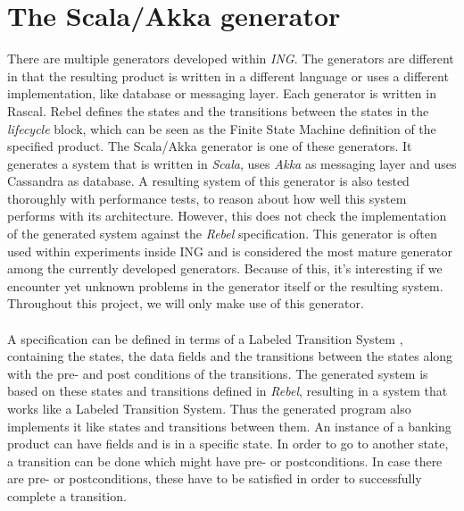 \section{The Scala/Akka generator}
There are multiple generators developed within \textit{ING}. The generators are different in that the resulting product is written in a different language or uses a different implementation, like database or messaging layer. Each generator is written in Rascal. Rebel defines the states and the transitions between the states in the \textit{lifecycle} block, which can be seen as the Finite State Machine definition of the specified product. The Scala/Akka generator is one of these generators. It generates a system that is written in \textit{Scala}, uses \textit{Akka} \cite{siteAkka2017} as messaging layer  and uses Cassandra \cite{siteCassandra2016} as database. A resulting system of this generator is also tested thoroughly with performance tests, to reason about how well this system performs with its architecture. However, this does not check the implementation of the generated system against the \textit{Rebel} specification. This generator is often used within experiments inside ING and is considered the most mature generator among the currently developed generators. Because of this, it's interesting if we encounter yet unknown problems in the generator itself or the resulting system. Throughout this project, we will only make use of this generator.\\
\\
A specification can be defined in terms of a Labeled Transition System \cite{stoel2016solving} , containing the states, the data fields and the transitions between the states along with the pre- and post conditions of the transitions. The generated system is based on these states and transitions defined in \textit{Rebel}, resulting in a system that works like a Labeled Transition System. Thus the generated program also implements it like states and transitions between them. An instance of a banking product can have fields and is in a specific state. In order to go to another state, a transition can be done which might have pre- or postconditions. In case there are pre- or postconditions, these have to be satisfied in order to successfully complete a transition.\\
